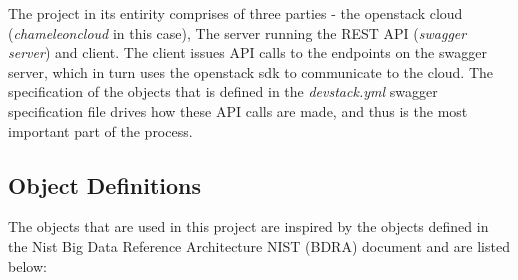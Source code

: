 The project in its entirity comprises of three parties - the openstack
cloud (\emph{chameleoncloud} in this case), The server running the
REST API (\emph{swagger server}) and client. The client issues API
calls to the endpoints on the swagger server, which in turn uses the
openstack sdk to communicate to the cloud. The specification of the
objects that is defined in the \emph{devstack.yml} swagger
specification file drives how these API calls are made, and thus is
the most important part of the process. 

\subsection{Object Definitions}
The objects that are used in this project are inspired by the objects
defined in the Nist Big Data Reference Architecture NIST (BDRA)
document and are listed below:

